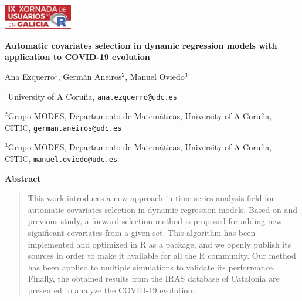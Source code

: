 \documentclass[twoside]{article}
\begin{document}
\begin{flushright}
\includegraphics[angle=0,keepaspectratio,width=3cm]{logo.pdf}
\end{flushright}

 \vspace{20pt}

\begin{center}
\textbf{Automatic covariates selection in dynamic regression models with application to COVID-19 evolution}

\vspace{0.15cm}

Ana Ezquerro$^{1}$, Germán Aneiros$^{2}$, Manuel Oviedo$^{3}$
\end{center}

\vspace{0.06cm}

$^{1}$University of A Coruña, \texttt{ana.ezquerro@udc.es}

$^{2}$Grupo MODES, Departamento de Matemáticas, University of A Coruña, CITIC, \texttt{german.aneiros@udc.es}


$^{3}$Grupo MODES, Departamento de Matemáticas, University of A Coruña, CITIC, \texttt{manuel.oviedo@udc.es}


\begin{center}
\textbf{Abstract}
\end{center}


\begin{quotation}
    This work introduces a new approach in time-series analysis field for automatic covariates selection in dynamic regression models. Based on \cite{cryer2008time} and \cite{hyndman2018forecasting} previous study, a forward-selection method is proposed for adding new significant covariates from a given set. This algorithm has been implemented and optimized in R as a package, and we openly publish its sources in order to make it available for all the R community. Our method has been applied to multiple simulations to validate its performance. Finally, the obtained results from the IRAS database of Catalonia are presented to analyze the COVID-19 evolution. 
\end{quotation}
\end{document}
